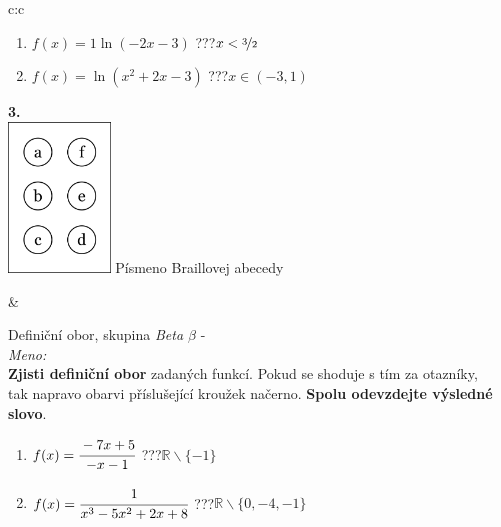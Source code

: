 \documentclass[10pt]{report}
\begin{document}
\begin{tabular}{c:c}
\begin{minipage}[c][99mm][t]{0.49\linewidth}
\begin{center}
\begin{minipage}{0.77\linewidth}
\begin{center}
\begin{varwidth}{\textwidth}
\begin{enumerate}
\item $f(x)=1\ln{(-2x-3)}$\quad \dotfill\; ???\;\dotfill \quad $x<\nicefrac{3}{2}$
\item $f(x)=\ln{(x^2+2x-3)}$\quad \dotfill\; ???\;\dotfill \quad $x\in(-3 , 1)$
\end{enumerate}
\end{varwidth}
\end{center}
\end{minipage}
\begin{minipage}{0.20\linewidth}
\begin{center}
{\Huge\bfseries 3.} \\[2mm]
\includegraphics[height=40mm]{../images/braille.png}
{\small Písmeno Braillovej abecedy}
\end{center}
\end{minipage}
\end{center}
\end{minipage}
&
\begin{minipage}[c][99mm][t]{0.49\linewidth}
\begin{center}
\vspace{7mm}
{\huge Definiční obor, skupina \textit{Beta $\beta$} -}\\[4.5mm]
\textit{Meno:}\phantom{xxxxxxxxxxxxxxxxxxxxxxxxxxxxxxxxxxxxxxxxxxxxxxxxxxxxxxxxxxxxxxxxx}\\[3.5mm]
\textbf{Zjisti definiční obor} zadaných funkcí. Pokud se shoduje s tím za otazníky,\\tak napravo obarvi příslušející kroužek načerno. \textbf{Spolu odevzdejte výsledné slovo}.\\[3mm]
\begin{minipage}{0.77\linewidth}
\begin{center}
\begin{varwidth}{\textwidth}
\begin{enumerate}
\normalsize
\item $f(x)=\cfrac{-7x+5}{-x-1}$\quad \dotfill\; ???\;\dotfill \quad $\mathbb{R}\smallsetminus\{-1\}$
\item $f(x)=\cfrac{1}{x^3-5x^2+2x+8}$\quad \dotfill\; ???\;\dotfill \quad $\mathbb{R}\smallsetminus\{0,-4,-1\}$

\end{enumerate}
\end{varwidth}
\end{center}
\end{minipage}
\end{center}
\end{minipage}
\end{tabular}
\end{document}
